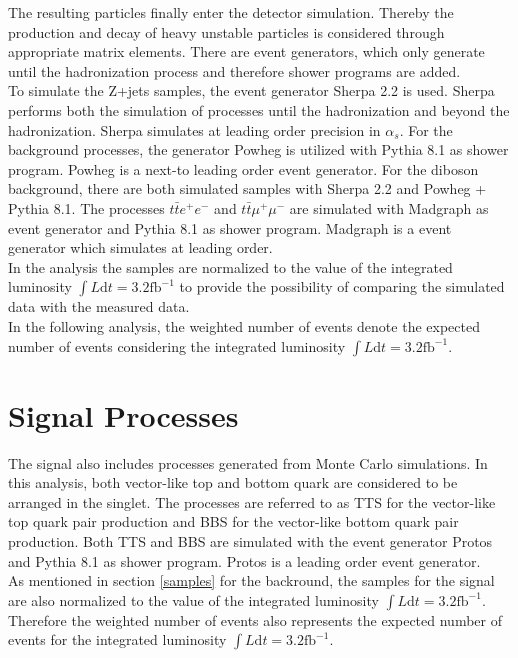 The resulting particles finally enter the detector simulation.
Thereby the production and decay of heavy unstable particles is considered through appropriate matrix elements.
There are event generators, which only generate until the hadronization process and therefore shower programs are added.\\
To simulate the Z+jets samples, the event generator Sherpa 2.2 is used.
Sherpa \cite{Sherpa} performs both the simulation of processes until the hadronization and beyond the hadronization.
Sherpa simulates at leading order precision in $\alpha_{s}$. 
For the \ttbar{} background processes, the generator Powheg is utilized with Pythia 8.1 \cite{Pythia} as shower program.
Powheg \cite{Powheg} is a next-to leading order event generator.
For the diboson background, there are both simulated samples with Sherpa 2.2 and Powheg + Pythia 8.1.
The processes $t \bar{t} e^{+}\!e^{-}$  and $t \bar{t} \mu^{+}\!\mu^{-}$ are simulated with Madgraph as event generator and Pythia 8.1 as shower program.
Madgraph \cite{Madgraph} is a event generator which simulates at leading order.\\
In the analysis the samples are normalized to the value of the integrated luminosity $\int{L} \mathrm{d}t = 3.2 \mathrm{fb}^{-1}$ to provide the possibility of comparing the simulated data with the measured data.\\
In the following analysis, the weighted number of events denote the expected number of events considering the integrated luminosity $\int{L} \mathrm{d}t = 3.2 \mathrm{fb}^{-1}$.


\section{Signal Processes}
The signal also includes processes generated from Monte Carlo simulations. 
In this analysis, both vector-like top and bottom quark are considered to be arranged in the singlet.
The processes are referred to as TTS for the vector-like top quark pair production and BBS for the vector-like bottom quark pair production.
Both TTS and BBS are simulated with the event generator Protos and Pythia 8.1 as shower program.
Protos \cite{Protos} is a leading order event generator.\\
As mentioned in section \ref{samples} for the backround, the samples for the signal are also normalized to the value of the integrated luminosity $\int{L} \mathrm{d}t = 3.2 \mathrm{fb}^{-1}$.
Therefore the weighted number of events also represents the expected number of events for the integrated luminosity $\int{L} \mathrm{d}t = 3.2 \mathrm{fb}^{-1}$.
